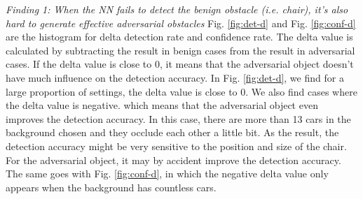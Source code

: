 \emph{Finding 1: When the NN fails to detect the benign obstacle (i.e. chair), it’s also hard to generate effective adversarial obstacles}
Fig. \ref{fig:det-d} and Fig. \ref{fig:conf-d} are the histogram for delta detection rate and confidence rate. 
The delta value is calculated by subtracting the result in benign cases from the result in adversarial cases.
If the delta value is close to 0, it means that the adversarial object doesn't have much influence on the detection accuracy. 
In Fig. \ref{fig:det-d}, we find for a large proportion of settings, the delta value is close to 0.
We also find cases where the delta value is negative. which means that the adversarial object even improves the detection accuracy. 
In this case, there are more than 13 cars in the background chosen and they occlude each other a little bit.
As the result, the detection accuracy might be very sensitive to the position and size of the chair. 
For the adversarial object, it may by accident improve the detection accuracy. 
The same goes with Fig. \ref{fig:conf-d}, in which the negative delta value only appears when the background has countless cars.


%
%
